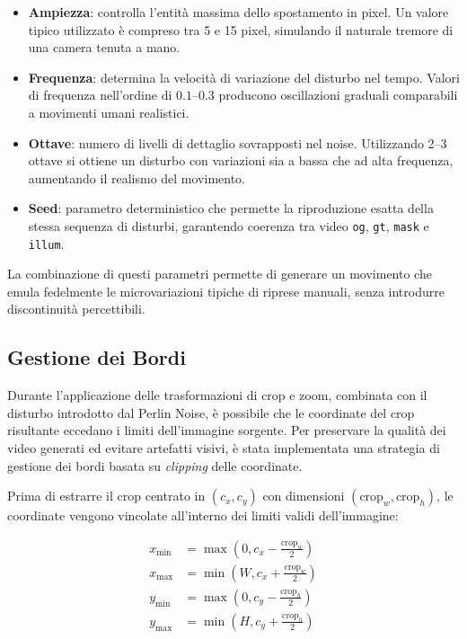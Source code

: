 \begin{itemize}
    \item \textbf{Ampiezza}: controlla l'entità massima dello spostamento in pixel. Un valore tipico utilizzato è compreso tra 5 e 15 pixel, simulando il naturale tremore di una camera tenuta a mano.

    \item \textbf{Frequenza}: determina la velocità di variazione del disturbo nel tempo. Valori di frequenza nell'ordine di $0.1$--$0.3$ producono oscillazioni graduali comparabili a movimenti umani realistici.

    \item \textbf{Ottave}: numero di livelli di dettaglio sovrapposti nel noise. Utilizzando 2--3 ottave si ottiene un disturbo con variazioni sia a bassa che ad alta frequenza, aumentando il realismo del movimento.

    \item \textbf{Seed}: parametro deterministico che permette la riproduzione esatta della stessa sequenza di disturbi, garantendo coerenza tra video \texttt{og}, \texttt{gt}, \texttt{mask} e \texttt{illum}.
\end{itemize}

La combinazione di questi parametri permette di generare un movimento che emula fedelmente le microvariazioni tipiche di riprese manuali, senza introdurre discontinuità percettibili.

\subsection{Gestione dei Bordi}
Durante l'applicazione delle trasformazioni di crop e zoom, combinata con il disturbo introdotto dal Perlin Noise, è possibile che le coordinate del crop risultante eccedano i limiti dell'immagine sorgente. Per preservare la qualità dei video generati ed evitare artefatti visivi, è stata implementata una strategia di gestione dei bordi basata su \emph{clipping} delle coordinate.

Prima di estrarre il crop centrato in $(c_x, c_y)$ con dimensioni $(\text{crop}_w, \text{crop}_h)$, le coordinate vengono vincolate all'interno dei limiti validi dell'immagine:

\begin{align}
    x_{\text{min}} &= \max\left(0, c_x - \frac{\text{crop}_w}{2}\right) \\
    x_{\text{max}} &= \min\left(W, c_x + \frac{\text{crop}_w}{2}\right) \\
    y_{\text{min}} &= \max\left(0, c_y - \frac{\text{crop}_h}{2}\right) \\
    y_{\text{max}} &= \min\left(H, c_y + \frac{\text{crop}_h}{2}\right)
\end{align}

